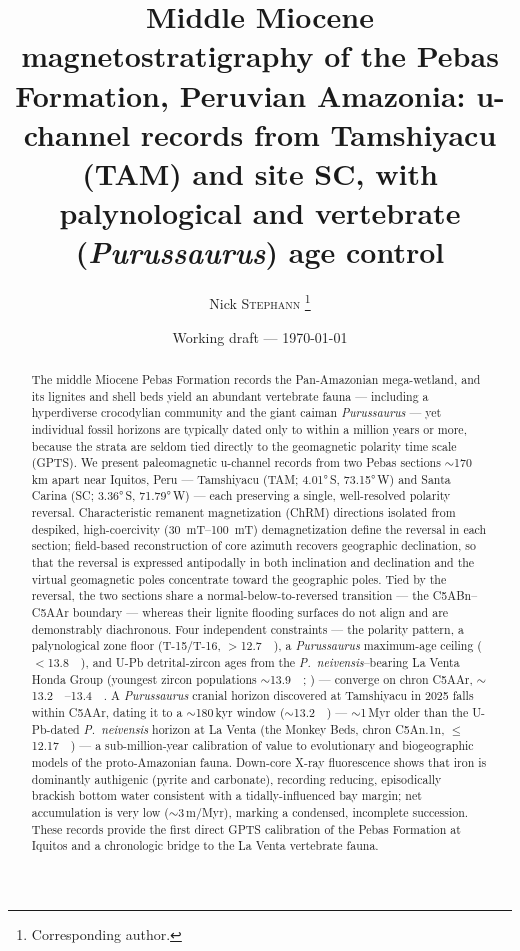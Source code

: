 \documentclass[11pt]{article}
\title{Middle Miocene magnetostratigraphy of the Pebas Formation, Peruvian
Amazonia: u-channel records from Tamshiyacu (TAM) and site SC, with
palynological and vertebrate (\textit{Purussaurus}) age control}
\author[1]{Nick \textsc{Stephann} \thanks{Corresponding author.}}
\affil[1]{\textit{[Affiliation --- to complete]}}
\date{Working draft --- \today}
\begin{document}
\maketitle

\begin{abstract}
\noindent The middle Miocene Pebas Formation records the Pan-Amazonian
mega-wetland, and its lignites and shell beds yield an abundant vertebrate fauna
--- including a hyperdiverse crocodylian community and the giant caiman
\textit{Purussaurus} --- yet individual fossil horizons are typically dated only
to within a million years or more, because the strata are seldom tied directly to
the geomagnetic polarity time scale (GPTS). We present paleomagnetic u-channel
records from two Pebas sections $\sim$170\,km apart near Iquitos, Peru ---
Tamshiyacu (TAM; \ang{4.01}\,S, \ang{73.15}\,W) and Santa Carina (SC;
\ang{3.36}\,S, \ang{71.79}\,W) --- each preserving a single, well-resolved
polarity reversal. Characteristic remanent magnetization (ChRM) directions
isolated from despiked, high-coercivity (\SIrange{30}{100}{\milli\tesla})
demagnetization define the reversal in each section; field-based reconstruction of
core azimuth recovers geographic declination, so that the reversal is expressed
antipodally in both inclination and declination and the virtual geomagnetic poles
concentrate toward the geographic poles. Tied by the reversal, the two sections
share a normal-below-to-reversed transition --- the C5ABn--C5AAr boundary ---
whereas their lignite flooding surfaces do not align and are demonstrably
diachronous. Four independent constraints --- the polarity pattern, a palynological
zone floor (T-15/T-16, $>$\SI{12.7}{\mega\annum}), a \textit{Purussaurus}
maximum-age ceiling ($<$\SI{13.8}{\mega\annum}), and U-Pb detrital-zircon ages from
the \textit{P.\ neivensis}--bearing La Venta Honda Group (youngest zircon
populations $\sim$\SI{13.9}{\mega\annum}; \citealp{MoraRojas2023}) --- converge on
chron C5AAr, $\sim$\SIrange{13.2}{13.4}{\mega\annum}. A \textit{Purussaurus}
cranial horizon discovered at Tamshiyacu in 2025 falls within C5AAr, dating it to a
$\sim$180\,kyr window ($\sim$\SI{13.2}{\mega\annum}) --- $\sim$1\,Myr older than the U-Pb-dated
\textit{P.\ neivensis} horizon at La Venta (the Monkey Beds, chron C5An.1n,
$\le$\SI{12.17}{\mega\annum}) --- a sub-million-year calibration of value to evolutionary and biogeographic
models of the proto-Amazonian fauna. Down-core X-ray fluorescence shows that iron
is dominantly authigenic (pyrite and carbonate), recording reducing, episodically
brackish bottom water consistent with a tidally-influenced bay margin; net
accumulation is very low ($\sim$3\,m/Myr), marking a condensed, incomplete
succession. These records provide the first direct GPTS calibration of the Pebas
Formation at Iquitos and a chronologic bridge to the La Venta vertebrate fauna.
\end{abstract}
\end{document}
